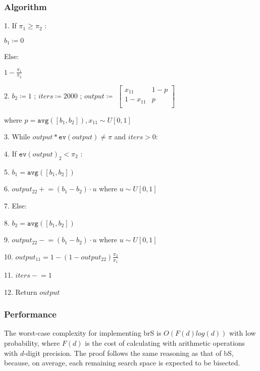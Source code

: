 \documentclass{article}
\begin{document}
\subsubsection{Algorithm}
1. If $\pi_1 \geq \pi_2$ :

\hspace{1cm} $b_1 \coloneqq 0$

\hspace{4mm}Else:

\hspace{1cm}$1-\frac{\pi_1}{\pi_2}$

2. $b_2 \coloneqq 1$ ; $iters \coloneqq 2000$ ; $output \coloneqq $
$\begin{bmatrix}
    x_{11}       & 1-p \\
    1-x_{11}       & p \\
\end{bmatrix}$

\hspace{4mm}where $p = \texttt{avg}([b_1, b_2]), x_{11} \sim U[0,1]$

3. While $output*\texttt{ev}(output) \neq \pi$ and $iters > 0$:

4. \hspace{1cm} If $\texttt{ev}(output)_2 < \pi_2$ :

5. \hspace{2cm} $b_1 = \texttt{avg}([b_1, b_2])$

6. \hspace{2cm} $output_{22} \mathrel{+}= (b_1-b_2) \cdot u$ where $u \sim U[0,1]$

7. \hspace{1.4cm} Else:

8. \hspace{2cm} $b_2 = \texttt{avg}([b_1, b_2])$

9. \hspace{2cm} $output_{22} \mathrel{-}= (b_1-b_2) \cdot u$ where $u \sim U[0,1]$

10. \hspace{1cm} $output_{11} = 1 - (1-output_{22})\frac{\pi_2}{\pi_1}$

11. \hspace{1cm} $iters \mathrel{-}= 1$

12. Return $output$

\subsubsection{Performance}
The worst-case complexity for implementing brS is $O(F(d)log(d))$ with low probability, where $F(d)$ is the cost of calculating with arithmetic operations with $d$-digit precision. The proof follows the same reasoning as that of bS, because, on average, each remaining search space is expected to be bisected.
\end{document}
